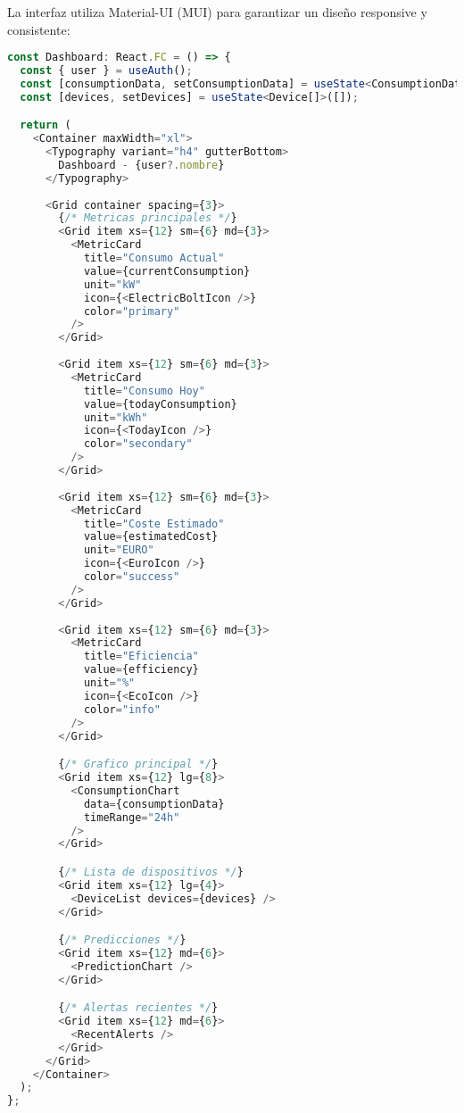 La interfaz utiliza Material-UI (MUI) para garantizar un diseño responsive y consistente:

\begin{lstlisting}[language=TypeScript, caption=Dashboard responsive]
const Dashboard: React.FC = () => {
  const { user } = useAuth();
  const [consumptionData, setConsumptionData] = useState<ConsumptionData[]>([]);
  const [devices, setDevices] = useState<Device[]>([]);

  return (
    <Container maxWidth="xl">
      <Typography variant="h4" gutterBottom>
        Dashboard - {user?.nombre}
      </Typography>
      
      <Grid container spacing={3}>
        {/* Metricas principales */}
        <Grid item xs={12} sm={6} md={3}>
          <MetricCard
            title="Consumo Actual"
            value={currentConsumption}
            unit="kW"
            icon={<ElectricBoltIcon />}
            color="primary"
          />
        </Grid>
        
        <Grid item xs={12} sm={6} md={3}>
          <MetricCard
            title="Consumo Hoy"
            value={todayConsumption}
            unit="kWh"
            icon={<TodayIcon />}
            color="secondary"
          />
        </Grid>
        
        <Grid item xs={12} sm={6} md={3}>
          <MetricCard
            title="Coste Estimado"
            value={estimatedCost}
            unit="EURO"
            icon={<EuroIcon />}
            color="success"
          />
        </Grid>
        
        <Grid item xs={12} sm={6} md={3}>
          <MetricCard
            title="Eficiencia"
            value={efficiency}
            unit="%"
            icon={<EcoIcon />}
            color="info"
          />
        </Grid>

        {/* Grafico principal */}
        <Grid item xs={12} lg={8}>
          <ConsumptionChart
            data={consumptionData}
            timeRange="24h"
          />
        </Grid>

        {/* Lista de dispositivos */}
        <Grid item xs={12} lg={4}>
          <DeviceList devices={devices} />
        </Grid>

        {/* Predicciones */}
        <Grid item xs={12} md={6}>
          <PredictionChart />
        </Grid>

        {/* Alertas recientes */}
        <Grid item xs={12} md={6}>
          <RecentAlerts />
        </Grid>
      </Grid>
    </Container>
  );
};
\end{lstlisting}

